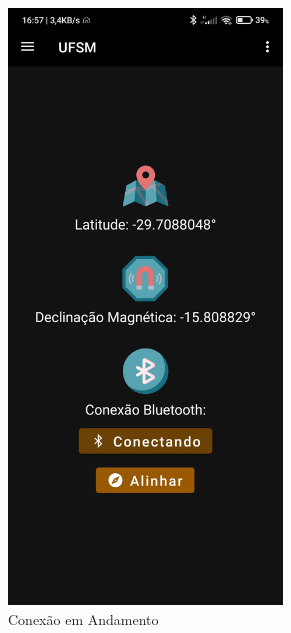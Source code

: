 \begin{figure}[!htb]
\begin{subfigure}[b]{0.3\textwidth}
		\includegraphics[width=0.8\textwidth]{figuras/desAplicativo/conectando}
		\caption{Conexão em Andamento}
	\end{subfigure}
	\hfill
	\begin{subfigure}[b]{0.3\textwidth}
		\centering

\end{subfigure}
\end{figure}

